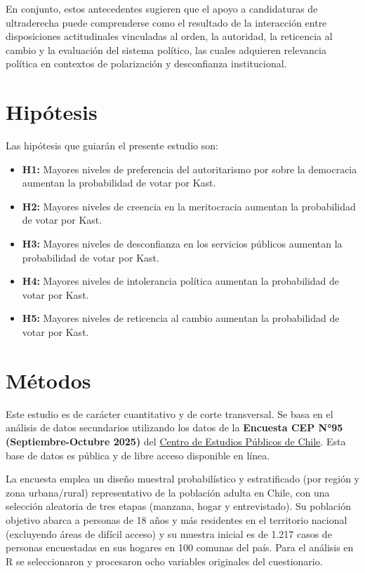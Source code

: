 \documentclass[
  spanish,
  a4paper,
  oneside]{scrbook}
\providecommand{\tightlist}{%
  \setlength{\itemsep}{0pt}\setlength{\parskip}{0pt}}
\begin{document}
En conjunto, estos antecedentes sugieren que el apoyo a candidaturas de
ultraderecha puede comprenderse como el resultado de la interacción
entre disposiciones actitudinales vinculadas al orden, la autoridad, la
reticencia al cambio y la evaluación del sistema político, las cuales
adquieren relevancia política en contextos de polarización y
desconfianza institucional.


\chapter{Hipótesis}\label{hipuxf3tesis}

Las hipótesis que guiarán el presente estudio son:

\begin{itemize}
\tightlist
\item
  \textbf{H1:} Mayores niveles de preferencia del autoritarismo por
  sobre la democracia aumentan la probabilidad de votar por Kast.
\item
  \textbf{H2:} Mayores niveles de creencia en la meritocracia aumentan
  la probabilidad de votar por Kast.
\item
  \textbf{H3:} Mayores niveles de desconfianza en los servicios públicos
  aumentan la probabilidad de votar por Kast.
\item
  \textbf{H4:} Mayores niveles de intolerancia política aumentan la
  probabilidad de votar por Kast.
\item
  \textbf{H5:} Mayores niveles de reticencia al cambio aumentan la
  probabilidad de votar por Kast.
\end{itemize}


\chapter{Métodos}\label{muxe9todos}

Este estudio es de carácter cuantitativo y de corte transversal. Se basa
en el análisis de datos secundarios utilizando los datos de la
\textbf{Encuesta CEP N°95 (Septiembre-Octubre 2025)} del
\href{https://www.cepchile.cl/encuesta/encuesta-cep-n-95-septiembre-octubre-2025/}{Centro
de Estudios Públicos de Chile}. Esta base de datos es pública y de libre
acceso disponible en línea.

La encuesta emplea un diseño muestral probabilístico y estratificado
(por región y zona urbana/rural) representativo de la población adulta
en Chile, con una selección aleatoria de tres etapas (manzana, hogar y
entrevistado). Su población objetivo abarca a personas de 18 años y más
residentes en el territorio nacional (excluyendo áreas de difícil
acceso) y su muestra inicial es de 1.217 casos de personas encuestadas
en sus hogares en 100 comunas del país. Para el análisis en R se
seleccionaron y procesaron ocho variables originales del cuestionario.
\end{document}
